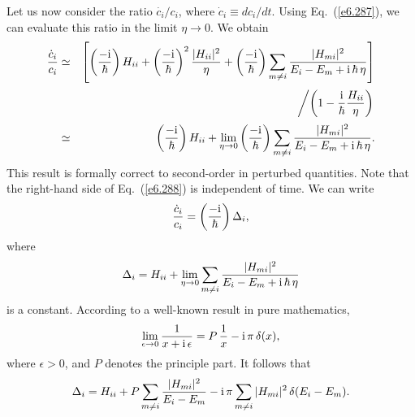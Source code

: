 Let us now consider the ratio $\dot{c_i}/c_i$, where $\dot{c}_i \equiv
d c_i/dt$. Using Eq.~(\ref{e6.287}), we can evaluate this ratio in the limit
$\eta\rightarrow 0$. We obtain
\begin{eqnarray}
\frac{\dot{c}_i}{c_i} &\simeq& \left[\left( \frac{-{\rm i}}{\hbar}\right) H_{ii} 
+ \left(\frac{-{\rm i}}{\hbar} \right)^2  \frac{ |H_{ii}|^2 
}{\eta}+
\left(\frac{-{\rm i}}{\hbar}\right) \sum_{m\neq i}
\frac{|H_{mi}|^2 }
{E_i -E_m+{\rm i}\,\hbar \,\eta}\right]\nonumber \nonumber\\[0.5ex]&&
\mbox{\hspace{1cm}}\left/\left( 1- \frac{\rm i}{\hbar}
\frac{H_{ii}}{\eta} \right)\right. \nonumber\\[0.5ex]
&\simeq & \left(\frac{-{\rm i}}{\hbar}\right) H_{ii} + \lim_{\eta\rightarrow
0}\left(
\frac{-{\rm i}}{\hbar}\right) \sum_{m\neq i}
\frac{|H_{mi}|^2}{E_i - E_m+ {\rm i}\,\hbar \,\eta}.\label{e6.288}
\end{eqnarray}
This result is formally correct to second-order in perturbed quantities.
Note that the right-hand side of Eq.~(\ref{e6.288}) is independent of time.
We can write
\begin{equation}\label{e6.289}
\frac{\dot{c}_i}{c_i}  = \left( \frac{-{\rm i}}{\hbar}\right) 
\Delta_i,
\end{equation}
where
\begin{equation}
\Delta_i = H_{ii}  + \lim_{\eta\rightarrow 0}
\sum_{m\neq i} \frac{|H_{mi}|^2}{E_i - E_m+ {\rm i}\,\hbar \,\eta} 
\end{equation}
is a constant.
According to a well-known result in pure mathematics,
\begin{equation}
\lim_{\epsilon\rightarrow 0} \frac{1}{x+{\rm i}\,\epsilon}
= P\,\frac{1}{x} - {\rm i}\,\pi\,\delta(x),
\end{equation}
where $\epsilon >0$, and $P$ denotes the principle part. 
It follows that
\begin{equation}
\Delta_i = H_{ii} + P\sum_{m\neq i} \frac{|H_{mi}|^2}{E_i - E_m}
- {\rm i}\,\pi \sum_{m\neq i} |H_{mi}|^2\, \delta(E_i - E_m).
\end{equation}


